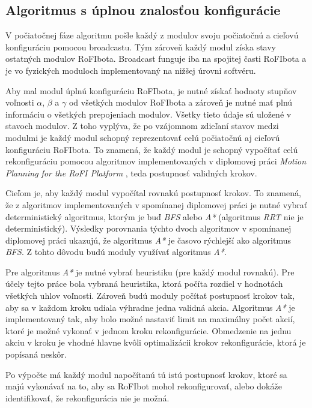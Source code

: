 \documentclass[
  digital, %
  oneside, %
  notable,   %
  lof,     %
  nolot,     %
]{fithesis3}
\begin{document}
\subsection{Algoritmus s úplnou znalosťou konfigurácie}
\label{sec:motionPlanningAlgo}
V počiatočnej fáze algoritmu pošle každý z modulov svoju počiatočnú a cieľovú konfiguráciu pomocou broadcastu. Tým zároveň každý modul získa stavy ostatných modulov RoFIbota. Broadcast funguje iba na spojitej časti RoFIbota a je vo fyzických moduloch implementovaný na nižšej úrovni softvéru.

Aby mal modul úplnú konfiguráciu RoFIbota, je nutné získať hodnoty stupňov voľnosti $\alpha$, $\beta$ a $\gamma$ od všetkých modulov RoFIbota a zároveň je nutné mať plnú informáciu o všetkých prepojeniach modulov. Všetky tieto údaje sú uložené v stavoch modulov. Z toho vyplýva, že po vzájomnom zdieľaní stavov medzi modulmi je každý modul schopný reprezentovať celú počiatočnú aj cieľovú konfiguráciu RoFIbota. To znamená, že každý modul je schopný vypočítať celú rekonfiguráciu pomocou algoritmov implementovaných v diplomovej práci \textit{Motion Planning for the RoFI Platform} \cite{vozarovaMasterThesis}, teda postupnosť validných krokov. 

Cieľom je, aby každý modul vypočítal rovnakú postupnosť krokov. To znamená, že z algoritmov implementovaných v spomínanej diplomovej práci je nutné vybrať deterministický algoritmus, ktorým je buď \textit{BFS} alebo \textit{A*} (algoritmus \textit{RRT} nie je deterministický). Výsledky porovnania týchto dvoch algoritmov v spomínanej diplomovej práci ukazujú, že algoritmus \textit{A*} je časovo rýchlejší ako algoritmus \textit{BFS}. Z tohto dôvodu budú moduly využívať algoritmus \textit{A*}. 

Pre algoritmus \textit{A*} je nutné vybrať heuristiku (pre každý modul rovnakú). Pre účely tejto práce bola vybraná heuristika, ktorá počíta rozdiel v hodnotách všetkých uhlov voľnosti. Zároveň budú moduly počítať postupnosť krokov tak, aby sa v každom kroku udiala výhradne jedna validná akcia. Algoritmus \textit{A*} je implementovaný tak, aby bolo možné nastaviť limit na maximálny počet akcií, ktoré je možné vykonať v jednom kroku rekonfigurácie. Obmedzenie na jednu akciu v kroku je vhodné hlavne kvôli optimalizácii krokov rekonfigurácie, ktorá je popísaná neskôr. 

Po výpočte má každý modul napočítanú tú istú postupnosť krokov, ktoré sa majú vykonávať na to, aby sa RoFIbot mohol rekonfigurovať, alebo dokáže identifikovať, že rekonfigurácia nie je možná. 
\end{document}

